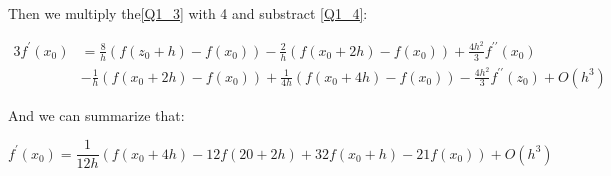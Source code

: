 \begin{solution}
Then we multiply the\ref{Q1_3} with 4 and substract \ref{Q1_4}:


\begin{equation}
\begin{aligned}
3 f^{\prime}\left(x_{0}\right) &=\frac{8}{h}\left(f\left(z_{0}+h\right)-f\left(x_{0}\right)\right)-\frac{2}{h}\left(f\left(x_{0}+2 h\right)-f\left(x_{0}\right)\right)+\frac{4 h^{2}}{3} f^{\prime \prime}\left(x_{0}\right) \\
&-\frac{1}{h}\left(f\left(x_{0}+2 h\right)-f\left(x_{0}\right)\right)+\frac{1}{4 h}\left(f\left(x_{0}+4 h\right)-f\left(x_{0}\right)\right)-\frac{4 h^{2}}{3} f^{\prime \prime}\left(z_{0}\right)+O\left(h^{3}\right)
\end{aligned}
\end{equation}

And we can summarize that:


\begin{equation}
f^{\prime}\left(x_{0}\right)=\frac{1}{12 h}\left(f\left(x_{0}+4 h\right)-12 f(20+2 h)+32 f\left(x_{0}+h\right)-21 f\left(x_{0}\right)\right)+O\left(h^{3}\right)
\end{equation}






\end{solution}





